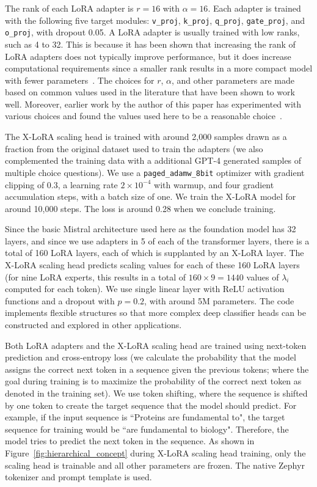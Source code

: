 \documentclass{article}
\begin{document}
The rank of each LoRA adapter is $r=16$ with $\alpha=16$. Each adapter is trained with the following five target  modules: \texttt{v\_proj}, \texttt{k\_proj}, \texttt{q\_proj},  \texttt{gate\_proj}, and \texttt{o\_proj}, with dropout 0.05. A LoRA adapter is usually trained with low ranks, such as 4 to 32. This is because it has been shown that increasing the rank of LoRA adapters does not typically improve performance, but it does increase computational requirements since a smaller rank results in a more compact model with fewer parameters~\cite{hu2021lora}. The choices for $r$, $\alpha$, and other parameters are made based on common values used in the literature that have been shown to work well. Moreover, earlier work by the author of this paper has experimented with various choices and found the values used here to be a reasonable choice~\cite{Luu2023BioinspiredLLM:Materials}. 


The X-LoRA scaling head is trained with around 2,000 samples drawn as a fraction from the original dataset used to train the adapters (we also complemented the training data with a additional GPT-4 generated samples of multiple choice questions). We use a \texttt{paged\_adamw\_8bit} optimizer with gradient clipping of 0.3, a learning rate $2\times 10^{-4}$ with warmup, and four gradient accumulation steps, with a batch size of one. We train the X-LoRA model for around 10,000 steps. The loss is around 0.28 when we conclude training. 

Since the basic Mistral architecture used here as the foundation model has 32 layers, and since we use adapters in 5 of each of the transformer layers, there is a total of 160 LoRA layers, each of which is supplanted by an X-LoRA layer. The X-LoRA scaling head predicts scaling values for each of these 160 LoRA layers (for nine LoRA experts, this results in a total of $160\times 9=1440$ values of $\lambda_i$ computed for each token). We use single linear layer with ReLU activation functions and a dropout with $p=0.2$, with around 5M parameters. The code implements flexible structures so that more complex deep classifier heads can be constructed and explored in other applications. 

Both LoRA adapters and the X-LoRA scaling head are trained using next-token prediction and cross-entropy loss (we calculate the probability that the model assigns the correct next token in a sequence given the previous tokens; where the goal during training is to maximize the probability of the correct next token as denoted in the training set). We use token shifting, where the sequence is  shifted by one token to create the target sequence that the model should predict. For example, if the input sequence is ``Proteins are fundamental to", the target sequence for training would be ``are fundamental to biology". Therefore, the model tries to predict the next token in the sequence.
%
As shown in Figure~\ref{fig:hierarchical_concept} during X-LoRA scaling head training, only the scaling head is trainable and all other parameters are frozen. The native Zephyr tokenizer and prompt template is used. 
\end{document}
